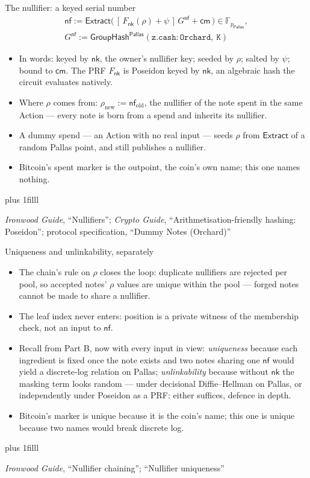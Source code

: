 \documentclass[aspectratio=169,11pt]{beamer}
\newcommand{\F}{\mathbb{F}}
\newcommand{\Pallas}{\ensuremath{\mathsf{Pallas}}}
\newcommand{\Fpp}{\ensuremath{\F_{p_{\Pallas}}}}
\newcommand{\nfsym}{\ensuremath{\mathsf{nf}}}
\newcommand{\cmsym}{\ensuremath{\mathsf{cm}}}
\newcommand{\nksym}{\ensuremath{\mathsf{nk}}}
\newcommand{\Extract}{\ensuremath{\mathsf{Extract}}}
\newcommand{\GroupHash}{\ensuremath{\mathsf{GroupHash}}}
\newcommand{\src}[1]{\par\vskip0pt plus 1filll
  {\fontsize{6}{7.2}\selectfont\color{arbdim}\raggedright #1\par}}
\begin{document}
\begin{frame}{The nullifier: a keyed serial number}
\vspace*{-8pt}
\begin{gather*}
\nfsym := \Extract\bigl(\,[\,F_{\nksym}(\rho) + \psi\,]\,
  G^{\mathsf{nf}} + \cmsym\,\bigr) \in \Fpp,\\
G^{\mathsf{nf}} := \GroupHash^{\Pallas}(\mathtt{z.cash:Orchard},\
  \mathtt{K})
\end{gather*}
\vspace*{-6pt}
\begin{itemize}
  \item In words: keyed by $\nksym$, the owner's nullifier key; seeded
    by $\rho$; salted by $\psi$; bound to $\cmsym$. The PRF
    $F_{\nksym}$ is Poseidon keyed by $\nksym$, an algebraic hash the
    circuit evaluates natively.
  \item Where $\rho$ comes from: $\rho_{\mathrm{new}} :=
    \nfsym_{\mathrm{old}}$, the nullifier of the note spent in the same
    Action --- every note is born from a spend and inherits its
    nullifier.
  \item A dummy spend --- an Action with no real input --- seeds
    $\rho$ from $\Extract$ of a random Pallas point, and still
    publishes a nullifier.
  \item Bitcoin's spent marker is the outpoint, the coin's own name;
    this one names nothing.
\end{itemize}
\src{\emph{Ironwood Guide}, ``Nullifiers''; \emph{Crypto Guide},
  ``Arithmetisation-friendly hashing: Poseidon''; protocol specification,
  ``Dummy Notes (Orchard)''}
\end{frame}

\begin{frame}{Uniqueness and unlinkability, separately}
\begin{itemize}
  \item The chain's rule on $\rho$ closes the loop: duplicate
    nullifiers are rejected per pool, so accepted notes' $\rho$ values
    are unique within the pool --- forged notes cannot be made to
    share a nullifier.
  \item The leaf index never enters: position is a private witness of
    the membership check, not an input to $\nfsym$.
  \item Recall from Part B, now with every input in view:
    \emph{uniqueness} because each ingredient is fixed once the note
    exists and two notes sharing one $\nfsym$ would yield a
    discrete-log relation on Pallas; \emph{unlinkability} because
    without $\nksym$ the masking term looks random --- under decisional
    Diffie--Hellman on Pallas, or independently under Poseidon as a
    PRF: either suffices, defence in depth.
  \item Bitcoin's marker is unique because it is the coin's name; this
    one is unique because two names would break discrete log.
\end{itemize}
\src{\emph{Ironwood Guide}, ``Nullifier chaining''; ``Nullifier uniqueness''}
\end{frame}
\end{document}
